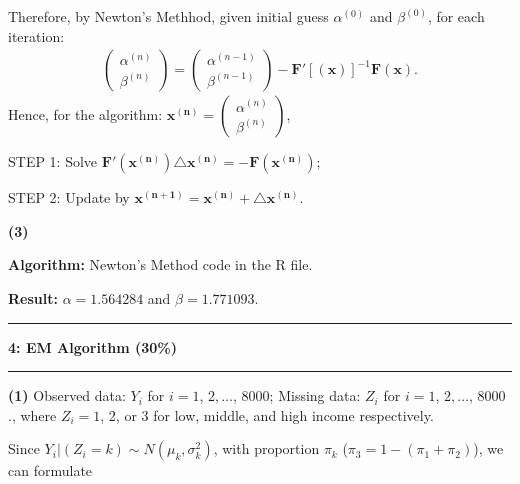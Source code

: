 \documentclass[11pt]{article}
\newcommand\question[2]{\vspace{.25in}\hrule\textbf{#1: #2}\vspace{.5em}\hrule\vspace{.10in}}
\renewcommand\part[1]{\vspace{.10in}\textbf{(#1)}}
\newcommand\algorithm{\vspace{.10in}\textbf{Algorithm: }}
\newcommand\result{\vspace{.10in}\textbf{Result: }}
\begin{document}
Therefore, by Newton's Methhod, given initial guess $\alpha^{(0)}$ and $\beta^{(0)}$, for each iteration: 
\begin{align*}
    \begin{pmatrix} \alpha^{(n)} \\ \beta^{(n)} \end{pmatrix} = \begin{pmatrix} \alpha^{(n-1)} \\ \beta^{(n-1)} \end{pmatrix} - \mathbf{F'}[(\mathbf{x})]^{-1}\mathbf{F}(\mathbf{x}).
\end{align*}
Hence, for the algorithm: $\mathbf{x^{(n)}} = \begin{pmatrix} \alpha^{(n)} \\ \beta^{(n)} \end{pmatrix}$,

STEP 1: Solve $\mathbf{F'}(\mathbf{x^{(n)}}) \mathbf{\triangle x^{(n)}} = - \mathbf{F}(\mathbf{x^{(n)}})$;

STEP 2: Update by $\mathbf{x^{(n+1)}} = \mathbf{x^{(n)}} + \mathbf{\triangle x^{(n)}}$.

\part{3}

\algorithm{Newton's Method code in the R file.}

\result{$\alpha = 1.564284$ and $\beta = 1.771093$.}

\question{4}{EM Algorithm (30\%)}

\part{1} Observed data: $Y_i$ for $i = 1$, $2, \dots$, $8000$; Missing data: $Z_i$ for $i = 1$, $2, \dots$, $8000$., where $Z_i = 1$, 2, or 3 for low, middle, and high income respectively.

Since $Y_i \big\rvert (Z_i=k) \sim N(\mu_k, \sigma_k^2)$, with proportion $\pi_k$ ($\pi_3 = 1 - (\pi_1 + \pi_2)$), we can formulate 
\end{document}
